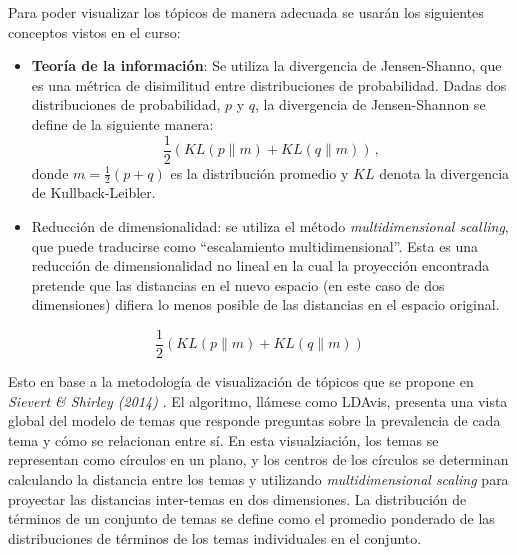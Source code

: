 \documentclass[
	spanish, %
	letterpaper, oneside
]{article}
\begin{document}
\newp Para poder visualizar los tópicos de manera adecuada se usarán los siguientes conceptos vistos en el curso:
\begin{itemize}
    \item \textbf{Teoría de la información}: Se utiliza la divergencia de Jensen-Shanno, que es una métrica de disimilitud entre distribuciones de probabilidad. Dadas dos distribuciones de probabilidad, $p$ y $q$, la divergencia de Jensen-Shannon se define de la siguiente manera:
    $$ \frac{1}{2}(KL(p\|m) + KL(q \| m) ) \,,$$
    donde $m = \frac{1}{2}(p + q)$ es la distribución promedio y $KL$ denota la divergencia de Kullback-Leibler.
    \item Reducción de dimensionalidad: se utiliza el método \textit{multidimensional scalling}, que puede traducirse como ``escalamiento multidimensional''. Esta es una reducción de dimensionalidad no lineal en la cual la proyección encontrada pretende que las distancias en el nuevo espacio (en este caso de dos dimensiones) difiera lo menos posible de las distancias en el espacio original.
\end{itemize}

$$ \frac{1}{2}(KL(p\|m) + KL(q \| m) ) $$

Esto en base a la metodología de visualización de tópicos que se propone en \textit{Sievert \& Shirley (2014)} \cite{viz}. El algoritmo, llámese como LDAvis, presenta una vista global del modelo de temas que responde preguntas sobre la prevalencia de cada tema y cómo se relacionan entre sí. En esta visualziación, los temas se representan como círculos en un plano, y los centros de los círculos se determinan calculando la distancia entre los temas y utilizando \textit{multidimensional scaling} para proyectar las distancias inter-temas en dos dimensiones. La distribución de términos de un conjunto de temas se define como el promedio ponderado de las distribuciones de términos de los temas individuales en el conjunto.
\end{document}
